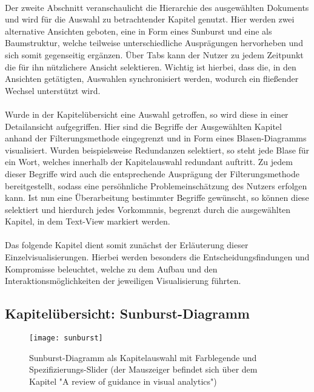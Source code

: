 \\
Der zweite Abschnitt veranschaulicht die Hierarchie des ausgew\"ahlten Dokuments und wird f\"ur die Auswahl zu betrachtender Kapitel genutzt. Hier werden zwei alternative Ansichten geboten, eine in Form eines Sunburst und eine als Baumstruktur, welche teilweise unterschiedliche Auspr\"agungen hervorheben und sich somit gegenseitig erg\"anzen. \"Uber Tabs kann der Nutzer zu jedem Zeitpunkt die f\"ur ihn n\"utzlichere Ansicht selektieren. Wichtig ist hierbei, dass die, in den Ansichten get\"atigten, Auswahlen synchronisiert werden, wodurch ein flie{\ss}ender Wechsel unterst\"utzt wird. \\
\\
Wurde in der Kapitel\"ubersicht eine Auswahl getroffen, so wird diese in einer Detailansicht aufgegriffen. Hier sind die Begriffe der Ausgew\"ahlten Kapitel anhand der Filterungsmethode eingegrenzt und in Form eines Blasen-Diagramms visualisiert. Wurden beispielsweise Redundanzen selektiert, so steht jede Blase f\"ur ein Wort, welches innerhalb der Kapitelauswahl redundant auftritt. Zu jedem dieser Begriffe wird auch die entsprechende Auspr\"agung der Filterungsmethode bereitgestellt, sodass eine pers\"ohnliche Problemeinsch\"atzung des Nutzers erfolgen kann. Ist nun eine \"Uberarbeitung bestimmter Begriffe gew\"unscht, so k\"onnen diese selektiert und hierdurch jedes Vorkommnis, begrenzt durch die ausgew\"ahlten Kapitel, in dem Text-View markiert werden.\\
\\
Das folgende Kapitel dient somit zun\"achst der Erl\"auterung dieser Einzelvisualisierungen. Hierbei werden besonders die Entscheidungsfindungen und Kompromisse beleuchtet, welche zu dem Aufbau und den Interaktionsm\"oglichkeiten der jeweiligen Visualisierung f\"uhrten.
\newpage
\subsection{Kapitel\"ubersicht: Sunburst-Diagramm} \label{subsec:sunburst}
\begin{figure}[!htbp]
 \centering
 \texttt{[image: sunburst]}
 \caption{Sunburst-Diagramm als Kapitelauswahl mit Farblegende und Spezifizierungs-Slider (der Mauszeiger befindet sich \"uber dem Kapitel "A review of guidance in visual analytics")}
 \label{fig:overview}
\end{figure}

